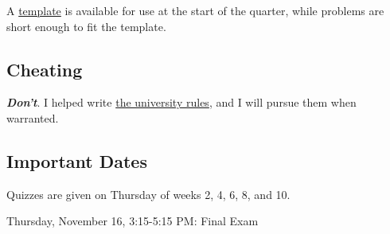 \documentclass[10pt]{article}
\begin{document}
A \href{http://www.cs.wright.edu/~jslater/materials/frmt.pdf}{template} is available for use at the start of the quarter, while problems are short enough to fit the template. 

\subsection*{Cheating}
\emph{\textbf{Don't}}. I helped write \href{http://www.wright.edu/students/judicial/integrity.html}{the university rules}, and I will pursue them when warranted. 

\subsection*{Important Dates}
Quizzes are given on Thursday of weeks 2, 4, 6, 8, and 10.

\noindent Thursday, November 16, 3:15-5:15 PM:     Final Exam\\
\end{document}
